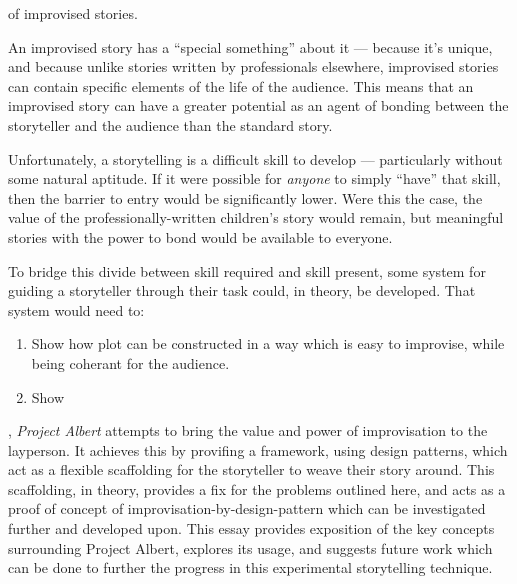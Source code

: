 \documentclass{tufte-handout}
\begin{document}
 of improvised stories. \par
An improvised story has a ``special something'' about it --- because it's unique, and because unlike stories written by professionals elsewhere, improvised stories can contain specific elements of the life of the audience. This means that an improvised story can have a greater potential as an agent of bonding between the storyteller and the audience than the standard story.\par

Unfortunately, a storytelling is a difficult skill to develop --- particularly without some natural aptitude. If it were possible for \emph{anyone} to simply ``have'' that skill, then the barrier to entry would be significantly lower. Were this the case, the value of the professionally-written children's story would remain, but meaningful stories with the power to bond would be available to everyone.\par

To bridge this divide between skill required and skill present, some system for guiding a storyteller through their task could, in theory, be developed. That system would need to:

\begin{enumerate}
    \item Show how plot can be constructed in a way which is easy to improvise, while being coherant for the audience.
    \item Show 
\end{enumerate}

, \emph{Project Albert} attempts to bring the value and power of improvisation to the layperson. It achieves this by provifing a framework, using design patterns, which act as a flexible scaffolding for the storyteller to weave their story around. This scaffolding, in theory, provides a fix for the problems outlined here, and acts as a proof of concept of improvisation-by-design-pattern which can be investigated further and developed upon. This essay provides exposition of the key concepts surrounding Project Albert, explores its usage, and suggests future work which can be done to further the progress in this experimental storytelling technique.
\end{document}
